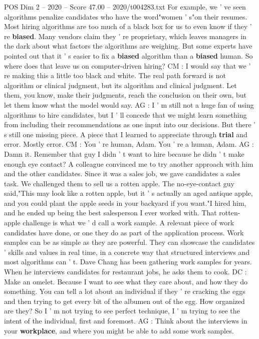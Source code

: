 \begin{textsample}{POS Dim 2 – 2020 – Score 47.00 – 2020/t004283.txt}
For example, we ' ve seen algorithms penalize candidates who have the word"women ' s"on their resumes.
Most hiring algorithms are too much of a black box for us to even know if they ' re \textbf{biased}.
Many vendors claim they ' re proprietary, which leaves managers in the dark about what factors the algorithms are weighing.
But some experts have pointed out that it ' s easier to fix a \textbf{biased} algorithm than a \textbf{biased} human.
So where does that leave us on computer-driven hiring?
CM : I would say that we ' re making this a little too black and white.
The real path forward is not algorithm or clinical judgment, but its algorithm and clinical judgment.
Let them, you know, make their judgments, reach the conclusion on their own, but let them know what the model would say.
AG : I ' m still not a huge fan of using algorithms to hire candidates, but I ' ll concede that we might learn something from including their recommendations as one input into our decisions.
But there ' s still one missing piece.
A piece that I learned to appreciate through \textbf{trial} and error.
Mostly error.
CM : You ' re human, Adam.
You ' re a human, Adam.
AG : Damn it.
Remember that guy I didn ' t want to hire because he didn ' t make enough eye contact?
A colleague convinced me to try another approach with him and the other candidates.
Since it was a sales job, we gave candidates a sales task.
We challenged them to sell us a rotten apple.
The no-eye-contact guy said,"This may look like a rotten apple, but it ' s actually an aged antique apple, and you could plant the apple seeds in your backyard if you want."I hired him, and he ended up being the best salesperson I ever worked with.
That rotten-apple challenge is what we ' d call a work sample.
A relevant piece of work candidates have done, or one they do as part of the application process.
Work samples can be as simple as they are powerful.
They can showcase the candidates ' skills and values in real time, in a concrete way that structured interviews and most algorithms can ' t.
Dave Chang has been gathering work samples for years.
When he interviews candidates for restaurant jobs, he asks them to cook.
DC : Make an omelet.
Because I want to see what they care about, and how they do something.
You can tell a lot about an individual if they ' re cracking the eggs and then trying to get every bit of the albumen out of the egg.
How organized are they?
So I ' m not trying to see perfect technique, I ' m trying to see the intent of the individual, first and foremost.
AG : Think about the interviews in your \textbf{workplace}, and where you might be able to add some work samples.

\end{textsample}
